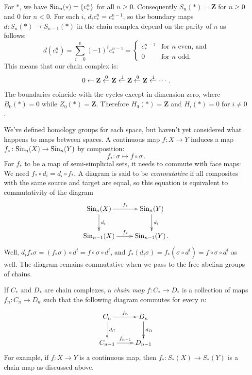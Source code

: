 For $\ast$, we have $\mathrm{Sin}_n(\ast)=\{c^n_\ast\}$ for all $n\geq 0$. Consequently $S_n(\ast)=\mathbf{Z}$ for $n\geq0$ and $0$ for $n<0$. 
For each $i$, $d_ic^n_\ast=c^{n-1}_\ast$, so
the boundary maps $d\colon S_n(\ast)\to S_{n-1}(\ast)$ in the chain complex depend on the parity of $n$ as follows:
\[d(c^n_\ast)=\sum_{i=0}^{n}(-1)^i c^{n-1}_\ast=
\begin{cases}
    c^{n-1}_* & \text{for } n \text{ even, and}\\
    0 & \text{for } n \text{ odd.}
  \end{cases}
\]
This means that our chain complex is:
\[
0\leftarrow\mathbf Z\xleftarrow{0}\mathbf Z\xleftarrow{1}\mathbf Z\xleftarrow{0}\mathbf Z\xleftarrow{1}\cdots\,.\]
The boundaries coincide with the cycles except in dimension zero, where $B_0(\ast)=0$ while $Z_0(\ast)=\mathbf{Z}$. Therefore $ H_0(\ast)=\mathbf{Z}$ and $ H_i(\ast)=0$ for $i\neq0$.

We've defined homology groups for each space, but haven't yet considered what happens to maps between spaces. A continuous map $f\colon X\to Y$ induces a map $f_\ast\colon \mathrm{Sin}_n(X)\to\mathrm{Sin}_n(Y)$ by composition: 
\[
f_\ast:\sigma\mapsto f\circ \sigma\,.
\] 
For $f_\ast$ to be a map of semi-simplicial sets, it needs to commute with face maps: We need $f_\ast \circ d_i = d_i \circ f_\ast$. A diagram is said to be \emph{commutative} if all composites with the same source and target are equal, so this equation is equivalent to commutativity of the diagram
\begin{eqnarray*}
\xymatrix{\Sin_n(X)\ar[r]^{f_\ast}\ar[d]^{d_i} & \Sin_n(Y)\ar[d]^{d_i}\\
\Sin_{n-1}(X)\ar[r]^{f_\ast} & \Sin_{n-1}(Y)\,.}
\end{eqnarray*}
Well, $d_if_\ast\sigma=(f_\ast\sigma)\circ d^i=f\circ\sigma\circ d^i$, and $f_\ast(d_i\sigma)=f_\ast(\sigma\circ d^i)=f\circ\sigma\circ d^i$ as well. The diagram remains commutative when we pass to the free abelian groups of chains.

If $C_\ast$ and $D_\ast$ are chain complexes, a \emph{chain map} $f\colon C_\ast\to D_\ast$ is a collection of maps $f_n\colon C_n\to D_n$ such that the following diagram commutes for every $n$:
\begin{equation*}
    \xymatrix{
	C_n\ar[r]^{f_n}\ar[d]^{d_C} & D_n\ar[d]^{d_D}\\
	C_{n-1}\ar[r]^{f_{n-1}} & D_{n-1}
    }
\end{equation*}
For example, if $f\colon X\to Y$ is a continuous map, then $f_\ast \colon S_\ast(X)\to S_\ast(Y)$ is a chain map as discussed above.

